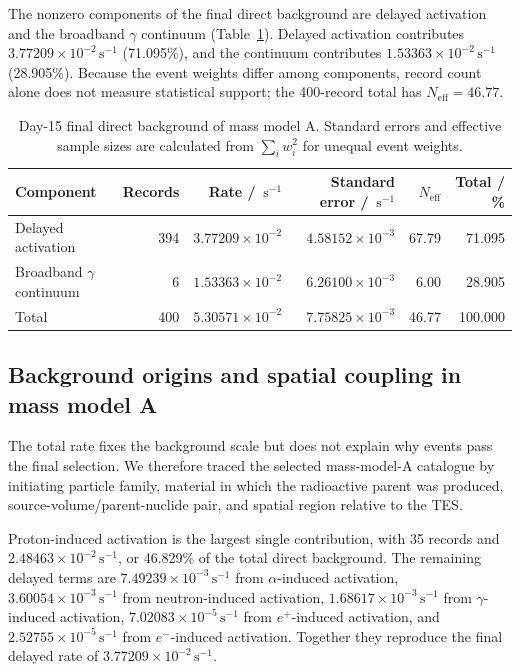 \documentclass[11pt]{article}
\newcommand{\cps}{\ensuremath{\,\mathrm{s^{-1}}}}
\begin{document}
The nonzero components of the final direct background are delayed activation and the broadband $\gamma$ continuum (Table~\ref{tab:reference_background_budget}). Delayed activation contributes $3.77209\times10^{-2}\cps$ (71.095\%), and the continuum contributes $1.53363\times10^{-2}\cps$ (28.905\%). Because the event weights differ among components, record count alone does not measure statistical support; the 400-record total has $N_{\mathrm{eff}}=46.77$.

\begin{table}[H]
\centering
\caption{Day-15 final direct background of mass model A. Standard errors and effective sample sizes are calculated from $\sum_i w_i^2$ for unequal event weights.}
\label{tab:reference_background_budget}
\footnotesize
\begin{tabular}{lrrrrr}
\toprule
Component & Records & Rate / $\cps$ & Standard error / $\cps$ & $N_{\mathrm{eff}}$ & Total / \% \\
\midrule
Delayed activation & 394 & $3.77209\times10^{-2}$ & $4.58152\times10^{-3}$ & 67.79 & 71.095 \\
Broadband $\gamma$ continuum & 6 & $1.53363\times10^{-2}$ & $6.26100\times10^{-3}$ & 6.00 & 28.905 \\
\midrule
Total & 400 & $5.30571\times10^{-2}$ & $7.75825\times10^{-3}$ & 46.77 & 100.000 \\
\bottomrule
\end{tabular}
\end{table}

\subsection{Background origins and spatial coupling in mass model A}
\label{subsec:mass_model_a_origins}

The total rate fixes the background scale but does not explain why events pass the final selection. We therefore traced the selected mass-model-A catalogue by initiating particle family, material in which the radioactive parent was produced, source-volume/parent-nuclide pair, and spatial region relative to the TES.

Proton-induced activation is the largest single contribution, with 35 records and $2.48463\times10^{-2}\cps$, or 46.829\% of the total direct background. The remaining delayed terms are $7.49239\times10^{-3}\cps$ from $\alpha$-induced activation, $3.60054\times10^{-3}\cps$ from neutron-induced activation, $1.68617\times10^{-3}\cps$ from $\gamma$-induced activation, $7.02083\times10^{-5}\cps$ from $e^+$-induced activation, and $2.52755\times10^{-5}\cps$ from $e^-$-induced activation. Together they reproduce the final delayed rate of $3.77209\times10^{-2}\cps$.
\end{document}
